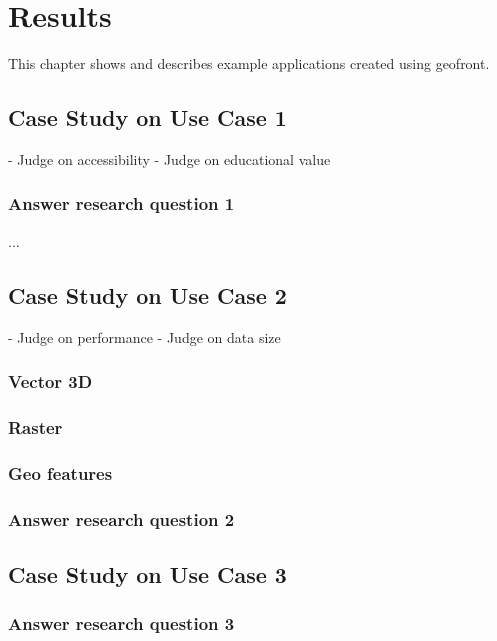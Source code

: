 \chapter{Results}%
This chapter shows and describes example applications created using geofront.

\section{Case Study on Use Case 1}%
- Judge on accessibility
- Judge on educational value

\subsection*{Answer research question 1}

...

\section{Case Study on Use Case 2}%
- Judge on performance
- Judge on data size

\subsection{Vector 3D}

\subsection{Raster}

\subsection{Geo features}

\subsection*{Answer research question 2}

\section{Case Study on Use Case 3}%

\subsection*{Answer research question 3}

